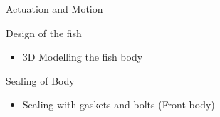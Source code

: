 \documentclass[10pt, a4paper]{beamer}
\begin{document}
\begin{frame}{Actuation and Motion}
\end{frame}

\begin{frame}{Design of the fish}
	\begin{itemize}
    \item 3D Modelling the fish body
    \end{itemize}
     \centering
\end{frame}

\begin{frame}{Sealing of Body}
	\begin{itemize}
    \item Sealing with gaskets and bolts (Front body)
    \end{itemize}
\end{frame}
\end{document}
